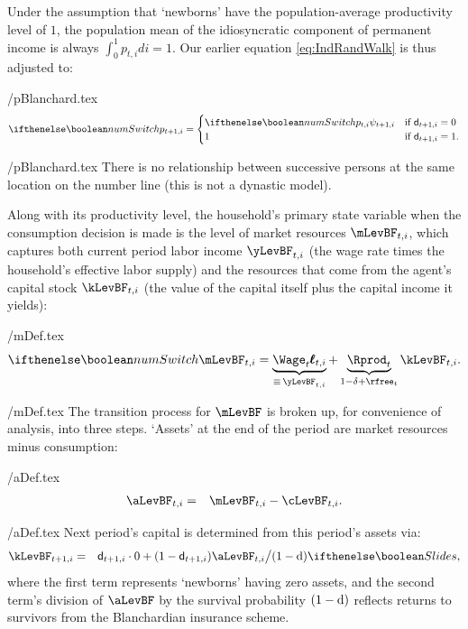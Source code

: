 \documentclass[titlepage]{\econtex}
\let\footnote=\endnote
\begin{document}
Under the assumption that `newborns' have the population-average productivity level of $1$, the population mean of the idiosyncratic component of permanent income is always $\int_{0}^{1} {p}_{t,i}di = 1$. %
Our earlier equation \eqref{eq:IndRandWalk} is thus adjusted to:%
\begin{verbatimwrite}{\eq/pBlanchard.tex}
\begin{equation*} \ifnumSw
{p}_{t+1,i} =
  \begin{cases}
    \ifnumSw  {p}_{t,i} \psi_{t+1,i} & \text{if } \pDies_{t+1,i} = 0 \\
    1 & \text{if } \pDies_{t+1,i} = 1. \\
  \end{cases}
\end{equation*}
\end{verbatimwrite}
 \eq/pBlanchard.tex
There is no relationship between successive persons at the same location on the number line (this is not a dynastic model).


Along with its productivity level, the household's primary state variable when the consumption decision is made is the level of market resources $\mLevBF_{t,i}$, which captures both current period labor income $\yLevBF_{t,i}$ (the wage rate times the household's effective labor supply) and the resources that come from the agent's capital stock $\kLevBF_{t,i}$ (the value of the capital itself plus the capital income it yields):
\begin{verbatimwrite}{\eq/mDef.tex}
\begin{equation}
\ifnumSw \mLevBF_{t,i} = \underbrace{{\bf \Wage}_{t} \pmb{\ell}_{t,i}}_{\equiv\,\yLevBF_{t,i}} + \underbrace{{\Rprod}_t}_{1-\delta+\rfree_{t}} \kLevBF_{t,i}.
\label{eq:mDef}
\end{equation}
\end{verbatimwrite}
 \eq/mDef.tex
The transition process for $\mLevBF$ is broken up, for convenience
of analysis, into three steps.  `Assets' at the end of the period are
market resources minus consumption:
\begin{verbatimwrite}{\eq/aDef.tex}
\begin{eqnarray}
   \aLevBF_{t,i} & = & \mLevBF_{t,i}-\cLevBF_{t,i}. \label{eq:aDef}
\end{eqnarray}
\end{verbatimwrite}
 \eq/aDef.tex
Next period's capital is determined from this period's assets via:
\begin{eqnarray}
\kLevBF_{t+1,i} & = & \pDies_{t+1,i} \cdot 0+ (1 - \pDies_{t+1,i})\aLevBF_{t,i} \big/\PLives \label{eq:ktp1icompact}
\ifslides{}{,}
\end{eqnarray}
where the first term represents `newborns' having zero assets, and the second term's division of $\aLevBF$ by the survival probability $(1-\mathrm{d})$ reflects returns to survivors from the Blanchardian insurance scheme.
\end{document}

